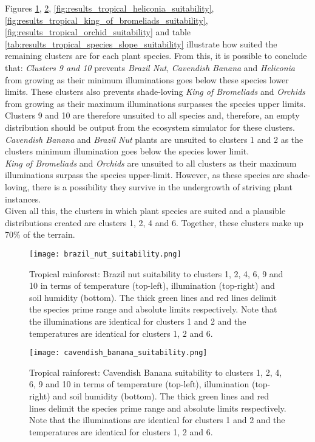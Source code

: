 Figures \ref{fig:results_tropical_brazil_nut_suitability}, \ref{fig:results_tropical_cavendish_banana_suitability}, \ref{fig:results_tropical_heliconia_suitability}, \ref{fig:results_tropical_king_of_bromeliads_suitability}, \ref{fig:results_tropical_orchid_suitability} and table \ref{tab:results_tropical_species_slope_suitability} illustrate how suited the remaining clusters are for each plant species. From this, it is possible to conclude that: \textit{Clusters 9 and 10} prevents \textit{Brazil Nut}, \textit{Cavendish Banana} and \textit{Heliconia} from growing as their minimum illuminations goes below these species lower limits. These clusters also prevents shade-loving \textit{King of Bromeliads} and \textit{Orchids} from growing as their maximum illuminations surpasses the species upper limits. Clusters 9 and 10 are therefore unsuited to all species and, therefore, an empty distribution should be output from the ecosystem simulator for these clusters.\\
\textit{Cavendish Banana} and \textit{Brazil Nut} plants are unsuited to clusters 1 and 2 as the clusters minimum illumination goes below the species lower limit.\\
\textit{King of Bromeliads} and \textit{Orchids} are unsuited to all clusters as their maximum illuminations surpass the species upper-limit. However, as these species are shade-loving, there is a possibility they survive in the undergrowth of striving plant instances.\\
Given all this, the clusters in which plant species are suited and a plausible distributions created are clusters 1, 2, 4 and 6. Together, these clusters make up 70\% of the terrain.\\

\begin{figure}
\center
	\texttt{[image: brazil\_nut\_suitability.png]}
	\caption{ Tropical rainforest: Brazil nut suitability to clusters 1, 2, 4, 6, 9 and 10 in terms of temperature (top-left), illumination (top-right) and soil humidity (bottom). The thick green lines and red lines delimit the species prime range and absolute limits respectively. Note that the illuminations are identical for clusters 1 and 2 and the temperatures are identical for clusters 1, 2 and 6. }
	\label{fig:results_tropical_brazil_nut_suitability}
\end{figure}

\begin{figure}
\center
	\texttt{[image: cavendish\_banana\_suitability.png]}
	\caption{ Tropical rainforest: Cavendish Banana suitability to clusters 1, 2, 4, 6, 9 and 10 in terms of temperature (top-left), illumination (top-right) and soil humidity (bottom). The thick green lines and red lines delimit the species prime range and absolute limits respectively. Note that the illuminations are identical for clusters 1 and 2 and the temperatures are identical for clusters 1, 2 and 6.}
	\label{fig:results_tropical_cavendish_banana_suitability}
\end{figure}

